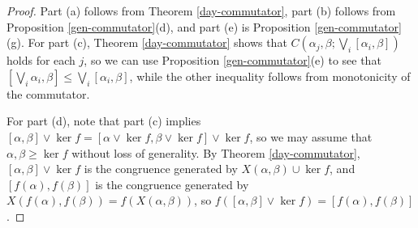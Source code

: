 \documentclass[letterpaper,11pt]{article}
\DeclareMathOperator{\Con}{Con}
\begin{document}
\begin{proof} Part (a) follows from Theorem \ref{day-commutator}, part (b) follows from Proposition \ref{gen-commutator}(d), and part (e) is Proposition \ref{gen-commutator}(g). For part (c), Theorem \ref{day-commutator} shows that $C(\alpha_j,\beta;\bigvee_i [\alpha_i,\beta])$ holds for each $j$, so we can use Proposition \ref{gen-commutator}(e) to see that $[\bigvee_i \alpha_i, \beta] \le \bigvee_i[\alpha_i,\beta]$, while the other inequality follows from monotonicity of the commutator.

For part (d), note that part (c) implies $[\alpha,\beta]\vee \ker f = [\alpha \vee \ker f, \beta \vee \ker f] \vee \ker f$, so we may assume that $\alpha,\beta \ge \ker f$ without loss of generality. By Theorem \ref{day-commutator}, $[\alpha,\beta]\vee \ker f$ is the congruence generated by $X(\alpha,\beta) \cup \ker f$, and $[f(\alpha),f(\beta)]$ is the congruence generated by $X(f(\alpha),f(\beta)) = f(X(\alpha,\beta))$, so $f([\alpha,\beta]\vee \ker f) = [f(\alpha),f(\beta)]$.



\end{proof}
\end{document}
